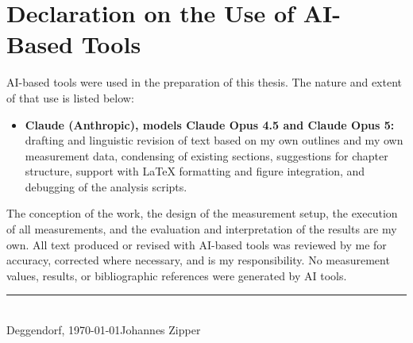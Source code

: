 \chapter*{Declaration on the Use of AI-Based Tools}

AI-based tools were used in the preparation of this thesis. The nature and
extent of that use is listed below:

\begin{itemize}
  \item \textbf{Claude (Anthropic), models Claude Opus 4.5 and Claude Opus 5:}
        drafting and linguistic revision of text based on my own outlines and
        my own measurement data, condensing of existing sections, suggestions
        for chapter structure, support with LaTeX formatting and figure
        integration, and debugging of the analysis scripts.
\end{itemize}

The conception of the work, the design of the measurement setup, the execution
of all measurements, and the evaluation and interpretation of the results are
my own. All text produced or revised with AI-based tools was reviewed by me for
accuracy, corrected where necessary, and is my responsibility. No measurement
values, results, or bibliographic references were generated by AI tools.

\vspace{2cm}
\noindent\rule{6cm}{0.4pt}\\
Deggendorf, \today \qquad Johannes Zipper

